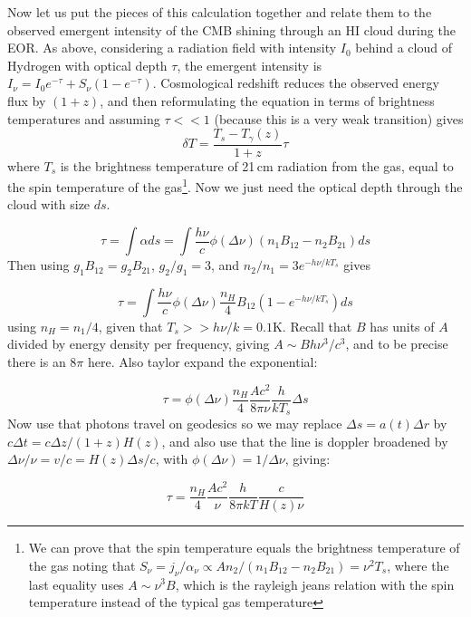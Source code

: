 Now let us put the pieces of this calculation together and relate them to the observed emergent intensity of the CMB shining through an HI cloud during the EOR. As above, considering a radiation field with intensity $I_0$ behind a cloud of Hydrogen with optical depth $\tau$, the emergent intensity is $I_\nu=I_0e^{-\tau}+S_\nu(1-e^{-\tau})$. Cosmological redshift reduces the observed energy flux by $(1+z)$, and then reformulating the equation in terms of brightness temperatures and assuming $\tau<<1$ (because this is a very weak transition) gives
\begin{equation}
\delta T=\frac{T_s-T_\gamma(z)}{1+z}\tau 
\end{equation}
where $T_s$ is the brightness temperature of 21\,cm radiation from the gas, equal to the spin temperature of the gas\footnote{We can prove that the spin temperature equals the brightness temperature of the gas noting that $S_\nu=j_\nu/\alpha_\nu\propto A n_2/(n_1B_{12}-n_2B_{21})=\nu^2 T_s$, where the last equality uses $A\sim\nu^3B$, which is the rayleigh jeans relation with the spin temperature instead of the typical gas temperature}. Now we just need the optical depth through the cloud with size $ds$.

\begin{equation}
\tau=\int\alpha ds=\int\frac{h\nu}{c}\phi(\Delta\nu)(n_1B_{12}-n_2B_{21})ds
\end{equation}
Then using $g_1B_{12}=g_2B_{21}$, $g_2/g_1=3$, and $n_2/n_1=3e^{-h\nu/kT_s}$ gives

\begin{equation}
\tau=\int\frac{h\nu}{c}\phi(\Delta\nu)\frac{n_H}{4}B_{12}(1-e^{-h\nu/kT_s})ds
\end{equation}
using $n_H=n_1/4$, given that $T_s>>h\nu/k=0.1$K. Recall that $B$ has units of $A$ divided by energy density per frequency, giving $A\sim Bh\nu^3/c^3$, and to be precise there is an $8\pi$ here. Also taylor expand the exponential:

\begin{equation}
\tau=\phi(\Delta\nu)\frac{n_H}{4}\frac{Ac^2}{8\pi\nu}\frac{h}{kT_s}\Delta s
\end{equation}
Now use that photons travel on geodesics so we may replace $\Delta s=a(t)\Delta r$ by $c\Delta t=c\Delta z/(1+z)H(z)$, and also use that the line is doppler broadened by $\Delta\nu/\nu=v/c=H(z)\Delta s/c$, with $\phi(\Delta\nu)=1/\Delta \nu$, giving:

\begin{equation}
\tau=\frac{n_H}{4}\frac{Ac^2}{\nu}\frac{h}{8\pi kT}\frac{c}{H(z)\nu}
\end{equation}

